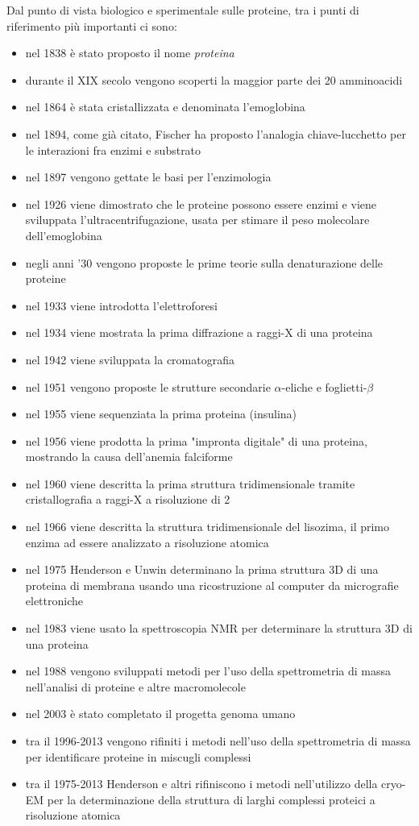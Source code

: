 Dal punto di vista biologico e sperimentale sulle proteine, tra i punti di riferimento più importanti ci sono\supercite{alberts2018essential}:
\begin{itemize}
	\item nel 1838 è stato proposto il nome \textit{proteina}
	\item durante il XIX secolo vengono scoperti la maggior parte dei 20 amminoacidi 
	\item nel 1864 è stata cristallizzata e denominata l'emoglobina
	\item nel 1894, come già citato, Fischer ha proposto l'analogia chiave-lucchetto per le interazioni fra enzimi e substrato
	\item nel 1897 vengono gettate le basi per l'enzimologia
	\item nel 1926 viene dimostrato che le proteine possono essere enzimi e viene sviluppata l'ultracentrifugazione, usata per stimare il peso molecolare dell'emoglobina
	\item negli anni '30 vengono proposte le prime teorie sulla denaturazione delle proteine
	\item nel 1933 viene introdotta l'elettroforesi
	\item nel 1934 viene mostrata la prima diffrazione a raggi-X di una proteina
	\item nel 1942 viene sviluppata la cromatografia
	\item nel 1951 vengono proposte le strutture secondarie $\alpha$-eliche e foglietti-$\beta$
	\item nel 1955 viene sequenziata la prima proteina (insulina)
	\item nel 1956 viene prodotta la prima "impronta digitale" di una proteina, mostrando la causa dell'anemia falciforme
	\item nel 1960 viene descritta la prima struttura tridimensionale tramite cristallografia a raggi-X a risoluzione di 2 \angstrom
	\item nel 1966 viene descritta la struttura tridimensionale del lisozima, il primo enzima ad essere analizzato a risoluzione atomica
	\item nel 1975 Henderson e Unwin determinano la prima struttura 3D di una proteina di membrana usando una ricostruzione al computer da micrografie elettroniche
	\item nel 1983 viene usato la spettroscopia NMR per determinare la struttura 3D di una proteina
	\item nel 1988 vengono sviluppati metodi per l'uso della spettrometria di massa nell'analisi di proteine e altre macromolecole
	\item nel 2003 è stato completato il progetta genoma umano
	\item tra il 1996-2013 vengono rifiniti i metodi nell'uso della spettrometria di massa per identificare proteine in miscugli complessi
	\item tra il 1975-2013 Henderson e altri rifiniscono i metodi nell'utilizzo della cryo-EM per la determinazione della struttura di larghi complessi proteici a risoluzione atomica
\end{itemize}

